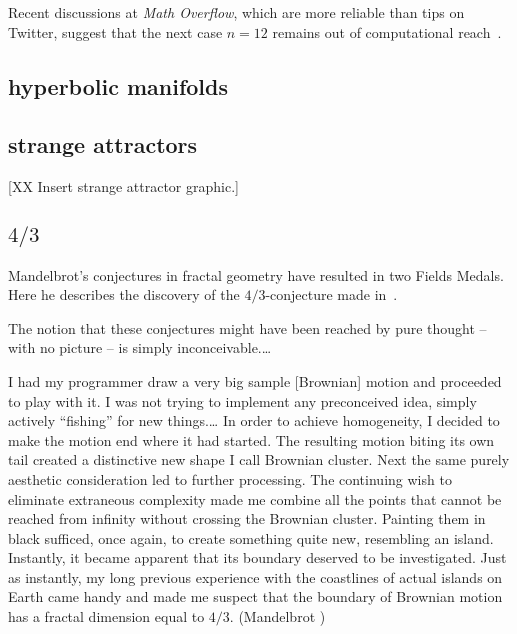 \documentclass{llncs}
\begin{document}

Recent discussions at {\it Math Overflow}, which are more reliable
than tips on Twitter, suggest that the next case $n=12$ remains out of
computational reach~\cite{Horn}.



\subsection{hyperbolic manifolds}
\subsection{strange attractors}


[XX Insert strange attractor graphic.]

\subsection{$4/3$}
Mandelbrot's conjectures in fractal geometry have resulted in two
Fields Medals.  Here he describes the discovery of the
$4/3$-conjecture made in~\cite{ManFN}.  

\bigskip

{

  \narrower\it 

  The notion that these conjectures might have been reached by pure
  thought -- with no picture -- is simply inconceivable.\dots

  I had my programmer draw a very big sample [Brownian] motion and
  proceeded to play with it. I was not trying to implement any
  preconceived idea, simply actively ``fishing'' for new things.\dots
  In order to achieve homogeneity, I decided to make the motion end
  where it had started. The resulting motion biting its own tail
  created a distinctive new shape I call Brownian cluster.  Next the
  same purely aesthetic consideration led to further processing. The
  continuing wish to eliminate extraneous complexity made me combine
  all the points that cannot be reached from infinity without crossing
  the Brownian cluster. Painting them in black sufficed, once again,
  to create something quite new, resembling an island.  Instantly, it
  became apparent that its boundary deserved to be investigated. Just
  as instantly, my long previous experience with the coastlines of
  actual islands on Earth came handy and made me suspect that the
  boundary of Brownian motion has a fractal dimension equal to $4/3$.
  (Mandelbrot \cite{Man})

}
\end{document}
